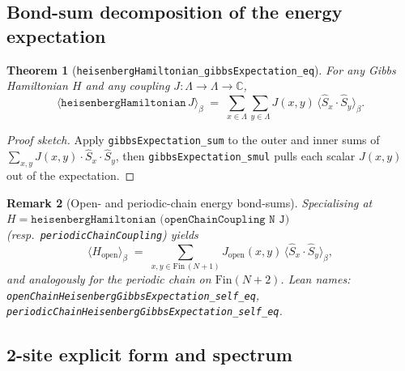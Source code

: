 \documentclass[a4paper,11pt]{article}
\newtheorem{theorem}{Theorem}
\newtheorem{remark}[theorem]{Remark}
\begin{document}
\subsection{Bond-sum decomposition of the energy expectation}
\label{subsec:heisenberg-bondsum}

\begin{theorem}[\texttt{heisenbergHamiltonian\_gibbsExpectation\_eq}]
For any Gibbs Hamiltonian $H$ and any coupling
$J : \Lambda \to \Lambda \to \mathbb{C}$,
\[
  \langle \texttt{heisenbergHamiltonian}\,J \rangle_\beta
  \;=\;
  \sum_{x \in \Lambda} \sum_{y \in \Lambda}
    J(x,y)\,\langle \hat S_x \cdot \hat S_y \rangle_\beta.
\]
\end{theorem}

\begin{proof}[Proof sketch]
Apply \texttt{gibbsExpectation\_sum} to the outer and inner sums of
$\sum_{x,y} J(x,y) \cdot \hat S_x \cdot \hat S_y$, then
\texttt{gibbsExpectation\_smul} pulls each scalar $J(x,y)$ out of the
expectation.
\end{proof}

\begin{remark}[Open- and periodic-chain energy bond-sums]
Specialising at
$H = \texttt{heisenbergHamiltonian (openChainCoupling N J)}$
(resp.\ \texttt{periodicChainCoupling}) yields
\[
  \langle H_{\mathrm{open}} \rangle_\beta
  \;=\;
  \sum_{x,y \in \mathrm{Fin}\,(N+1)}
    J_{\mathrm{open}}(x,y)\,\langle \hat S_x \cdot \hat S_y \rangle_\beta,
\]
and analogously for the periodic chain on $\mathrm{Fin}(N+2)$.
Lean names: \texttt{openChainHeisenbergGibbsExpectation\_self\_eq},
\texttt{periodicChainHeisenbergGibbsExpectation\_self\_eq}.
\end{remark}

\subsection{2-site explicit form and spectrum}
\label{subsec:two-site-spectrum}
\end{document}
